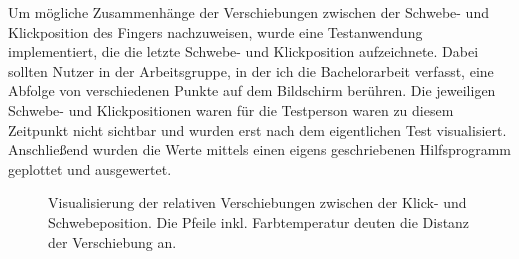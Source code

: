 \documentclass[a4paper,12pt,bibliography=totoc]{scrreprt}%
\begin{document}
Um mögliche Zusammenhänge der Verschiebungen zwischen der Schwebe- und Klickposition des Fingers nachzuweisen, wurde eine Testanwendung implementiert, die die letzte Schwebe- und Klickposition aufzeichnete. Dabei sollten Nutzer in der Arbeitsgruppe, in der ich die Bachelorarbeit verfasst, eine Abfolge von verschiedenen Punkte auf dem Bildschirm berühren. Die jeweiligen Schwebe- und Klickpositionen waren für die Testperson waren zu diesem Zeitpunkt nicht sichtbar und wurden erst nach dem eigentlichen Test visualisiert. Anschließend wurden die Werte mittels einen eigens geschriebenen Hilfsprogramm geplottet und ausgewertet.

\begin{figure}
\hfill
{}
\caption{Visualisierung der relativen Verschiebungen zwischen der Klick- und Schwebeposition. Die Pfeile inkl. Farbtemperatur deuten die Distanz der Verschiebung an.}
\label{klickschwebepositionen}
\end{figure}
\end{document}
